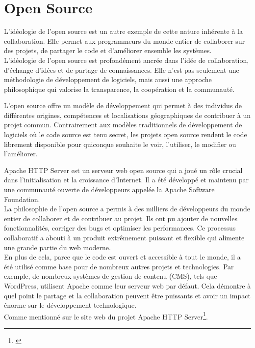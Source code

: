 \section{Open Source} 
L'idéologie de l'open source est un autre exemple de cette nature inhérente à la collaboration. Elle permet aux programmeurs du monde entier de collaborer sur des projets, de partager le code et d'améliorer ensemble les systèmes.\\

L'idéologie de l'open source est profondément ancrée dans l'idée de collaboration, d'échange d'idées et de partage de connaissances. Elle n'est pas seulement une méthodologie de développement de logiciels, mais aussi une approche philosophique qui valorise la transparence, la coopération et la communauté.

L'open source offre un modèle de développement qui permet à des individus de différentes origines, compétences et localisations géographiques de contribuer à un projet commun. Contrairement aux modèles traditionnels de développement de logiciels où le code source est tenu secret, les projets open source rendent le code librement disponible pour quiconque souhaite le voir, l'utiliser, le modifier ou l'améliorer.

Apache HTTP Server est un serveur web open source qui a joué un rôle crucial dans l'initialisation et la croissance d'Internet. Il a été développé et maintenu par une communauté ouverte de développeurs appelée la Apache Software Foundation.\\
La philosophie de l'open source a permis à des milliers de développeurs du monde entier de collaborer et de contribuer au projet. Ils ont pu ajouter de nouvelles fonctionnalités, corriger des bugs et optimiser les performances. Ce processus collaboratif a abouti à un produit extrêmement puissant et flexible qui alimente une grande partie du web moderne.\\
En plus de cela, parce que le code est ouvert et accessible à  tout le monde, il a été utilisé comme base pour de nombreux autres projets et technologies. Par exemple, de nombreux systèmes de gestion de contenu (CMS), tels que WordPress, utilisent Apache comme leur serveur web par défaut. Cela démontre à quel point le partage et la collaboration peuvent être puissants et avoir un impact énorme sur le développement technologique.\\

Comme mentionné sur le site web du projet Apache HTTP Server\footnote{\cite{apache}}.

